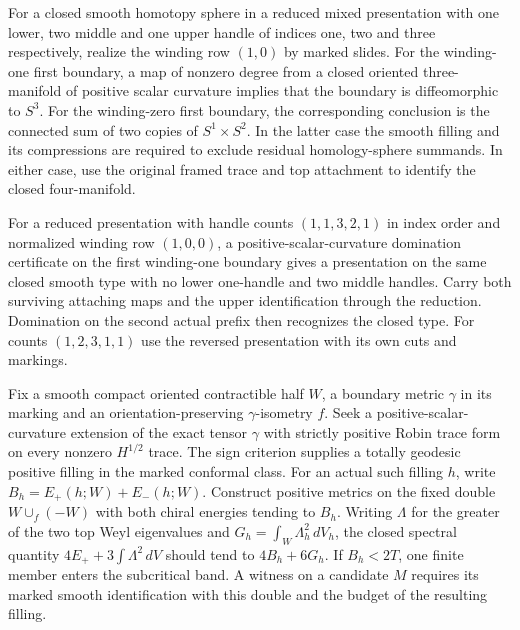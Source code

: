 \begin{openproblem}
\label{ed04:prefix}
For a closed smooth homotopy sphere in a reduced mixed presentation
with one lower, two middle and one upper handle of indices one, two and
three respectively, realize the winding row $(1,0)$ by marked slides.
For the winding-one first boundary, a map of nonzero degree from a closed
oriented three-manifold of positive scalar curvature implies that the
boundary is diffeomorphic to $S^3$. For the winding-zero first boundary,
the corresponding conclusion is the connected sum of two copies of
$S^1\times S^2$. In the latter case the smooth filling and its
compressions are required to exclude residual homology-sphere summands.
In either case, use the original framed trace and top attachment to
identify the closed four-manifold.
\end{openproblem}

\begin{openproblem}
\label{ed04:successor}
For a reduced presentation with handle counts $(1,1,3,2,1)$ in index
order and normalized winding row $(1,0,0)$, a positive-scalar-curvature
domination certificate on the first winding-one boundary gives a
presentation on the same closed smooth type with no lower one-handle
and two middle handles. Carry both surviving attaching maps and the
upper identification through the reduction. Domination on the second
actual prefix then recognizes the closed type. For counts $(1,2,3,1,1)$
use the reversed presentation with its own cuts and markings.
\end{openproblem}

\begin{openproblem}
\label{ed04:entry}
Fix a smooth compact oriented contractible half $W$, a boundary metric
$\gamma$ in its marking and an orientation-preserving $\gamma$-isometry
$f$. Seek a positive-scalar-curvature extension of the exact tensor
$\gamma$ with strictly positive Robin trace form on every nonzero
$H^{1/2}$ trace. The sign criterion supplies a totally geodesic positive
filling in the marked conformal class. For an actual such filling $h$,
write $B_h=E_+(h;W)+E_-(h;W)$. Construct positive metrics on the fixed
double $W\cup_f(-W)$ with both chiral energies tending to $B_h$.
Writing $\Lambda$ for the greater of the two top Weyl eigenvalues and
$G_h=\int_W\Lambda_h^2\,dV_h$, the closed spectral quantity
$4E_++3\int\Lambda^2\,dV$ should tend to $4B_h+6G_h$.
If $B_h<2T$, one finite member enters the subcritical band. A witness
on a candidate $M$ requires its marked smooth identification with this
double and the budget of the resulting filling.
\end{openproblem}

